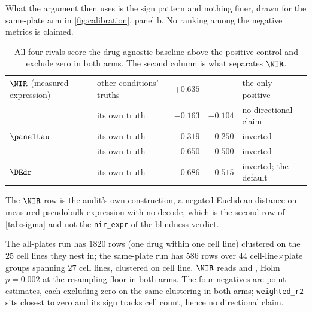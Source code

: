 What the argument then uses is the sign pattern and nothing finer, drawn for the
same-plate arm in \cref{fig:calibration}, panel b. No ranking among the negative
metrics is claimed.

\begin{table}[htbp]
\caption{ All
four rivals score the drug-agnostic baseline above the positive control and
exclude zero in both arms. The second column is what separates $\NIR$.}
\label{tab:drf}
\begin{fullwidth}
\begin{threeparttable}
\begin{tabularx}{\linewidth}{@{}Z{1.15} Z{1.0} r r Z{0.85}@{}}
 &  & 
  &  &  \\
\midrule
$\NIR$ (measured expression) & other conditions' truths & $+0.635$ & 
  & the only positive \\
\addlinespace[10pt]
 & its own truth & $-0.163$ & $-0.104$
  & no directional claim \\
$\paneltau$ & its own truth & $-0.319$ & $-0.250$ & inverted \\
 & its own truth & $-0.650$ & $-0.500$ & inverted \\
$\DEdr$ & its own truth & $-0.686$ & $-0.515$ & inverted; the default \\
\end{tabularx}
\begin{tablenotes}[flushleft]
\item The $\NIR$ row is the audit's own construction, a negated Euclidean
distance on measured pseudobulk expression with no decode, which is the second
row of \cref{tab:sigma} and not the \texttt{nir\_expr} of the blindness verdict.
\item The all-plates run has $\num{1820}$ rows (one drug within one cell line)
clustered on the $25$ cell lines they nest in; the same-plate run has
$\num{586}$ rows over $44$ cell-line$\times$plate groups spanning $27$ cell
lines, clustered on cell line. $\NIR$ reads  and
, Holm $p = 0.002$ at the resampling floor in both
arms. The four negatives are point estimates, each excluding zero on the same
clustering in both arms; \texttt{weighted\_r2} sits closest to zero and its sign
tracks cell count, hence no directional claim.
\end{tablenotes}
\end{threeparttable}
\end{fullwidth}
\end{table}



